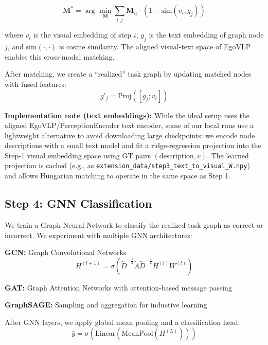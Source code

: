 \documentclass[10pt,twocolumn,letterpaper]{article}
\begin{document}
\begin{equation}
\mathbf{M}^* = \arg\min_{\mathbf{M}} \sum_{i,j} \mathbf{M}_{ij} \cdot (1 - \text{sim}(v_i, g_j))
\end{equation}

where $v_i$ is the visual embedding of step $i$, $g_j$ is the text embedding of graph node $j$, and $\text{sim}(\cdot, \cdot)$ is cosine similarity. The aligned visual-text space of EgoVLP enables this cross-modal matching.

After matching, we create a ``realized'' task graph by updating matched nodes with fused features:
\begin{equation}
g'_j = \text{Proj}([g_j; v_i])
\end{equation}

\textbf{Implementation note (text embeddings):} While the ideal setup uses the aligned EgoVLP/PerceptionEncoder text encoder, some of our local runs use a lightweight alternative to avoid downloading large checkpoints: we encode node descriptions with a small text model and fit a ridge-regression projection into the Step-1 visual embedding space using GT pairs $(\text{description}, v)$. The learned projection is cached (e.g., as \texttt{extension\_data/step3\_text\_to\_visual\_W.npy}) and allows Hungarian matching to operate in the same space as Step 1.

\subsection{Step 4: GNN Classification}

We train a Graph Neural Network to classify the realized task graph as correct or incorrect. We experiment with multiple GNN architectures:

\textbf{GCN:} Graph Convolutional Networks \cite{kipf2017gcn}
\begin{equation}
H^{(l+1)} = \sigma(\tilde{D}^{-\frac{1}{2}}\tilde{A}\tilde{D}^{-\frac{1}{2}}H^{(l)}W^{(l)})
\end{equation}

\textbf{GAT:} Graph Attention Networks \cite{velickovic2018gat} with attention-based message passing

\textbf{GraphSAGE:} Sampling and aggregation for inductive learning \cite{hamilton2017graphsage}

After GNN layers, we apply global mean pooling and a classification head:
\begin{equation}
\hat{y} = \sigma(\text{Linear}(\text{MeanPool}(H^{(L)})))
\end{equation}
\end{document}
